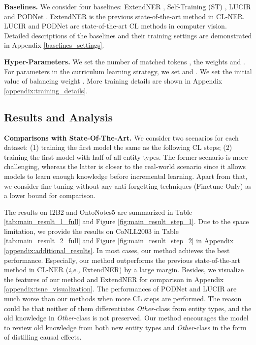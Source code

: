 \documentclass[11pt]{article}
\begin{document}
\noindent\textbf{Baselines.}\quad
We consider four baselines: 
ExtendNER \citep{monaikul2021continual}, Self-Training (ST) \citep{rosenberg2005semi,de2019continual}, LUCIR \citep{hou2019learning} and PODNet \citep{douillard2020podnet}.
ExtendNER is the previous state-of-the-art method in CL-NER.
LUCIR and PODNet are state-of-the-art CL methods in computer vision.
Detailed descriptions of the baselines and their training settings are demonstrated in Appendix \ref{baselines_settings}.

\noindent\textbf{Hyper-Parameters.}\quad
We set the number of matched tokens , the weights  and .
For parameters in the curriculum learning strategy, we set  and .
We set the initial value of balancing weight .
More training details are shown in Appendix \ref{appendix:training_details}.

\subsection{Results and Analysis}
\noindent\textbf{Comparisons with State-Of-The-Art.}\quad
We consider two scenarios for each dataset: (1) training the first model the same as the following CL steps; (2) training the first model with half of all entity types.
The former scenario is more challenging, whereas the latter is closer to the real-world scenario since it allows models to learn enough knowledge before incremental learning.
Apart from that, we consider fine-tuning without any anti-forgetting techniques (Finetune Only) as a lower bound for comparison.

The results on I2B2 and OntoNotes5 are summarized in Table \ref{tab:main_result_1_full} and Figure \ref{fig:main_result_step_1}.
Due to the space limitation, we provide the results on CoNLL2003 in Table \ref{tab:main_result_2_full} and Figure \ref{fig:main_result_step_2} in Appendix \ref{appendix:additional_results}.
In most cases, our method achieves the best performance.
Especially, our method outperforms the previous state-of-the-art method in CL-NER (\textit{i,e.,} ExtendNER) by a large margin.
Besides, we visualize the features of our method and ExtendNER for comparison in Appendix \ref{appendix:tsne_visualization}.
The performances of PODNet and LUCIR are much worse than our methods when more CL steps are performed. 
The reason could be that neither of them differentiates \textit{Other}-class from entity types, and the old knowledge in \textit{Other}-class is not preserved.
Our method encourages the model to review old knowledge from both new entity types and \textit{Other}-class in the form of distilling causal effects.
\end{document}
